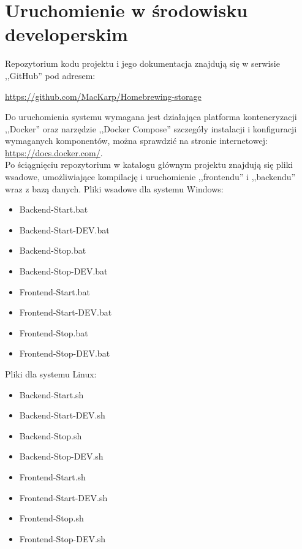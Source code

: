 \documentclass[12pt,a4paper]{article}
\begin{document}
	\section{Uruchomienie w środowisku developerskim}
		\indent Repozytorium kodu projektu i jego dokumentacja znajdują się w serwisie ,,GitHub'' pod adresem: 
			\begin{tcolorbox}[minipage,colback=white,arc=0pt,outer arc=0pt, fontupper=\scriptsize]
				\center
				\url{https://github.com/MacKarp/Homebrewing-storage}
			\end{tcolorbox}
		\indent Do uruchomienia systemu wymagana jest działająca platforma konteneryzacji ,,Docker''
			oraz narzędzie ,,Docker Compose'' szczegóły instalacji i konfiguracji wymaganych
			komponentów, można sprawdzić na stronie internetowej: \url{https://docs.docker.com/}.\\
		\indent Po ściągnięciu repozytorium w katalogu głównym projektu znajdują się pliki wsadowe, umożliwiające kompilację i uruchomienie ,,frontendu'' i ,,backendu''
		wraz z bazą danych.
		Pliki wsadowe dla systemu Windows:
		\begin{itemize}
			\item Backend-Start.bat
			\item Backend-Start-DEV.bat
			\item Backend-Stop.bat
			\item Backend-Stop-DEV.bat
			\item Frontend-Start.bat
			\item Frontend-Start-DEV.bat
			\item Frontend-Stop.bat
			\item Frontend-Stop-DEV.bat
		\end{itemize}
		Pliki dla systemu Linux:
		\begin{itemize}
			\item Backend-Start.sh
			\item Backend-Start-DEV.sh
			\item Backend-Stop.sh
			\item Backend-Stop-DEV.sh
			\item Frontend-Start.sh
			\item Frontend-Start-DEV.sh
			\item Frontend-Stop.sh
			\item Frontend-Stop-DEV.sh
		\end{itemize}
\end{document}
